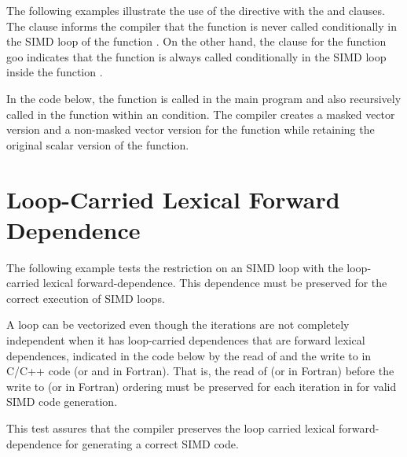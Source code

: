 The following examples illustrate the use of the   
directive with the  and  clauses. The 
 clause informs the compiler that the function  is 
never called conditionally in the SIMD loop of the function . On 
the other hand, the  clause for the function goo indicates that 
the function is always called conditionally in the SIMD loop inside 
the function .




In the code below, the function  is called in the main program and 
also recursively called in the function  within an  
condition. The compiler creates a masked vector version and a non-masked vector 
version for the function  while retaining the original scalar 
version of the  function.





\pagebreak
\section{Loop-Carried Lexical Forward Dependence}
\label{sec:SIMD_forward_dep}


 The following example tests the restriction on an SIMD loop with the loop-carried lexical forward-dependence. This dependence must be preserved for the correct execution of SIMD loops.

A loop can be vectorized even though the iterations are not completely independent when it has loop-carried dependences that are forward lexical dependences, indicated in the code below by the read of  and the write to  in C/C++ code (or  and  in Fortran). That is, the read of  (or  in Fortran) before the write to  (or  in Fortran) ordering must be preserved for each iteration in  for valid SIMD code generation.

This test assures that the compiler preserves the loop carried lexical forward-dependence for generating a correct SIMD code.



